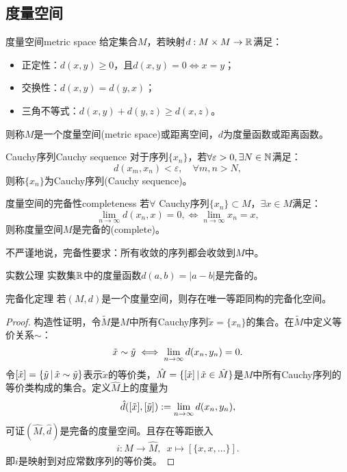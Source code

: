 \subsection{度量空间}

\begin{definition}
    {度量空间}{metric space}
    给定集合$M$，若映射$d:M\times M\to\mathbb R$满足：
    \begin{itemize}
        \item 正定性：$d(x,y)\geq 0$，且$d(x,y)=0\iff x=y$；
        \item 交换性：$d(x,y)=d(y,x)$；
        \item 三角不等式：$d(x,y)+d(y,z)\geq d(x,z)$。
    \end{itemize}
    则称$M$是一个度量空间(metric space)或距离空间，$d$为度量函数或距离函数。
\end{definition}

\begin{definition}
    {Cauchy序列}{Cauchy sequence}
    对于序列$\{x_n\}$，若$\forall\varepsilon>0,\exists N\in\mathbb N$满足：
    \begin{equation}
        d(x_m,x_n)<\varepsilon,\quad\forall m,n>N,
    \end{equation}
    则称$\{x_n\}$为Cauchy序列(Cauchy sequence)。
\end{definition}

\begin{definition}
    {度量空间的完备性}{completeness}
    若$\forall$ Cauchy序列$\{x_n\}\subset M$，$\exists x\in M$满足：
    \[
        \lim_{n\to\infty}d(x_n,x)=0,\iff\lim_{n\to\infty}x_n=x,
    \]
    则称度量空间$M$是完备的(complete)。
\end{definition}

\begin{remark}
    不严谨地说，完备性要求：所有收敛的序列都会收敛到$M$中。%
\end{remark}

\begin{example}
    {实数公理}{}
    实数集$\mathbb R$中的度量函数$d(a,b)=|a-b|$是完备的。
\end{example}

\begin{theorem}
    {完备化定理}{}
    若$(M,d)$是一个度量空间，则存在唯一等距同构的完备化空间。%
\end{theorem}

\begin{proof}
    构造性证明，令$\tilde M$是$M$中所有Cauchy序列$\tilde x=\{x_n\}$的集合。在$\tilde M$中定义等价关系$\sim$：
    \[
        \tilde x\sim\tilde y\iff\lim_{n{\to\infty}}d(x_n,y_n)=0.
    \]
    令$[\tilde x]=\{\tilde y\,|\,\tilde x\sim\tilde y\}$表示$\tilde x$的等价类，$\hat M=\{[\tilde x]\,|\,\tilde x\in\tilde M\}$是$M$中所有Cauchy序列的等价类构成的集合。定义$\hat M$上的度量为
    \[
        \hat d([\tilde x],[\tilde y]):=\lim_{n{\to\infty}}d(x_n,y_n),
    \]
    可证$(\hat M,\hat d)$是完备的度量空间。且存在等距嵌入
    \[
        i:M\to\hat M,\enspace x\mapsto[\{x,x,\ldots\}].
    \]
    即$i$是映射到对应常数序列的等价类。
\end{proof}

